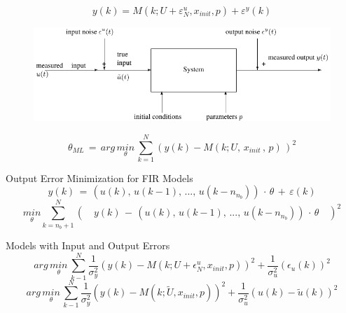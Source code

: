 \begin{tcolorbox}[colback=green!5!white,colframe=green!75!black,title=\textbf{Model with Input and Output Errors}] 
	\begin{equation*}
	y(k)=M(k;U+{\varepsilon  }_{ N }^{ u },{ x }_{ init },p)+{ { \varepsilon }^{ y } }(k)
	\end{equation*}
\begin{figure}[H]
	\centering
	\includegraphics[width=\linewidth]{./model.pdf}
	\label{model}
\end{figure}
\end{tcolorbox}

\begin{tcolorbox}[colback=green!5!white,colframe=green!75!black,title=\textbf{Pure Output Error (OE) Minimization}]
\begin{equation*}
\theta _{ ML } \, =\, arg\, \underset { \theta  }{ min } \, \sum _{ k=1 }^{ N }{ (y(k)-M(k;U,\, x_{ init }\, ,\, p)\, )^{ 2 } }
\end{equation*}

Output Error Minimization for FIR Models
\begin{equation*}
y(k) \, = \, (u(k),\, u(k-1),\, ...,\, u(k-n_{n_b})) \, \cdot \, \theta \, + \, \varepsilon(k)
\end{equation*}
\begin{equation*}
\underset { \theta  }{ min } \sum _{ k=n_{ b }+1 }^{ N }{ (\quad y(k)\, -\, (u(k),\, u(k-1),\, ...,\, u(k-n_{ n_{ b } }))\, \cdot \, \theta \quad )^{ 2 } } 
\end{equation*}

Models with Input and Output Errors
\begin{equation*}
arg \, \underset { \theta  }{ min } \, \sum _{ k-1 }^{ N }{ \frac { 1 }{ { \sigma  }_{ y }^{ 2 } }  } { (y(k)-M(k;U+{ \epsilon  }_{ N }^{ u },{ x }_{ init },p)) }^{ 2 }+\frac { 1 }{ { \sigma  }_{ u }^{ 2 } } { ({ \epsilon  }_{ u }(k)) }^{ 2 }
\end{equation*}
\begin{equation*}
arg \, \underset { \theta  }{ min } \, \sum _{ k-1 }^{ N }{ \frac { 1 }{ { \sigma  }_{ y }^{ 2 } }  } { (y(k)-M(k;\tilde { U } ,{ x }_{ init },p)) }^{ 2 }+\frac { 1 }{ { \sigma  }_{ u }^{ 2 } } { (u(k)-\tilde{ u }(k) ) }^{ 2 }
\end{equation*}
\end{tcolorbox}